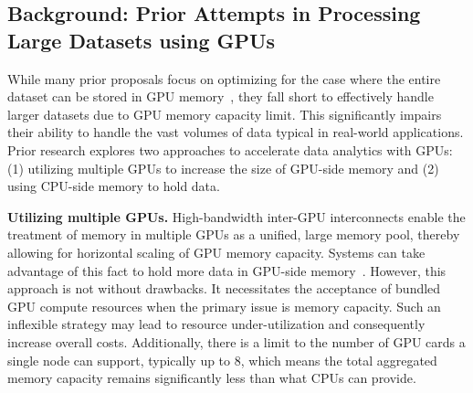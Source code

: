 \subsection{Background: Prior Attempts in Processing Large Datasets using GPUs}


While many prior proposals focus on optimizing for the case where the entire dataset can be stored in GPU memory~\cite{tcudb-sigmod-2022, tqp-vldb-2022, crystal-sigmod-20}, they fall short to effectively handle larger datasets due to GPU memory capacity limit.
This significantly impairs their ability to handle the vast volumes of data typical in real-world applications.
Prior research explores two approaches to accelerate data analytics with GPUs: (1) utilizing multiple GPUs to increase the size of GPU-side memory and (2) using CPU-side memory to hold data.

\noindent
\textbf{Utilizing multiple GPUs.}
High-bandwidth inter-GPU interconnects enable the treatment of memory in multiple GPUs as a unified, large memory pool, thereby allowing for horizontal scaling of GPU memory capacity. 
Systems can take advantage of this fact to hold more data in GPU-side memory~\cite{heavyai, mg-join-sigmod-2021, multi-gpu-sort-sigmod-2022}.
However, this approach is not without drawbacks. 
It necessitates the acceptance of bundled GPU compute resources when the primary issue is memory capacity. 
Such an inflexible strategy may lead to resource under-utilization and consequently increase overall costs.
Additionally, there is a limit to the number of GPU cards a single node can support, typically up to 8, which means the total aggregated memory capacity remains significantly less than what CPUs can provide.

